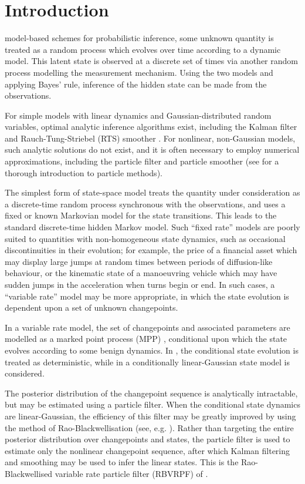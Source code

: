 \documentclass[journal]{IEEEtran}
\begin{document}
\section{Introduction}
 model-based schemes for probabilistic inference, some unknown quantity is treated as a random process which evolves over time according to a dynamic model. This latent state is observed at a discrete set of times via another random process modelling the measurement mechanism. Using the two models and applying Bayes' rule, inference of the hidden state can be made from the observations.

For simple models with linear dynamics and Gaussian-distributed random variables, optimal analytic inference algorithms exist, including the Kalman filter \cite{Kalman1960} and Rauch-Tung-Striebel (RTS) smoother \cite{Rauch1965}. For nonlinear, non-Gaussian models, such analytic solutions do not exist, and it is often necessary to employ numerical approximations, including the particle filter \cite{Gordon1993} and particle smoother \cite{Doucet2000a,Godsill2004} (see \cite{Cappe2007,Doucet2009} for a thorough introduction to particle methods).

The simplest form of state-space model treats the quantity under consideration as a discrete-time random process synchronous with the observations, and uses a fixed or known Markovian model for the state transitions. This leads to the standard discrete-time hidden Markov model. Such ``fixed rate'' models are poorly suited to quantities with non-homogeneous state dynamics, such as occasional discontinuities in their evolution; for example, the price of a financial asset which may display large jumps at random times between periods of diffusion-like behaviour, or the kinematic state of a manoeuvring vehicle which may have sudden jumps in the acceleration when turns begin or end. In such cases, a ``variable rate'' model may be more appropriate, in which the state evolution is dependent upon a set of unknown changepoints.

In a variable rate model, the set of changepoints and associated parameters are modelled as a marked point process (MPP) \cite{Jacobsen2006}, conditional upon which the state evolves according to some benign dynamics. In \cite{Godsill2007,Whiteley2011}, the conditional state evolution is treated as deterministic, while in \cite{Godsill2007a,Christensen2012} a conditionally linear-Gaussian state model is considered.

The posterior distribution of the changepoint sequence is analytically intractable, but may be estimated using a particle filter. When the conditional state dynamics are linear-Gaussian, the efficiency of this filter may be greatly improved by using the method of Rao-Blackwellisation (see, e.g. \cite{Casella1996,Doucet2000}). Rather than targeting the entire posterior distribution over changepoints and states, the particle filter is used to estimate only the nonlinear changepoint sequence, after which Kalman filtering and smoothing may be used to infer the linear states. This is the Rao-Blackwellised variable rate particle filter (RBVRPF) of \cite{Godsill2007a,Christensen2012}.
\end{document}
